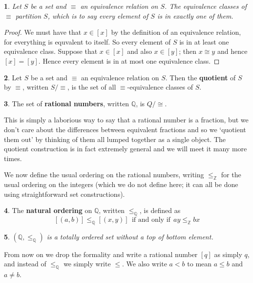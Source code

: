 \documentclass[oneside,english]{amsbook}
\numberwithin{section}{chapter}
\theoremstyle{plain}
\newtheorem{thm}{\protect\theoremname}
\theoremstyle{definition}
\newtheorem{defn}[thm]{\protect\definitionname}
\providecommand{\definitionname}{Definition}
\providecommand{\theoremname}{Theorem}
\begin{document}
\begin{thm}
	Let $S$ be a set and $\equiv$ an equivalence relation on $S$. The equivalence classes of $\equiv$ partition $S$, which is to say every element of $S$ is in exactly one of them.
\end{thm}

\begin{proof}
	We must have that $x\in [x]$ by the definition of an equivalence relation, for everything is equvalent to itself. So every element of $S$ is in at least one equivalence class. Suppose that $x\in [x]$ and also $x\in [y]$; then $x\cong y$ and hence $[x]=[y]$.  Hence every element is in at most one equivalence class. 
\end{proof}

\begin{defn}
	Let $S$ be a set and $\equiv$ an equivalence relation on $S$. Then the \textbf{quotient} of $S$ by $\equiv$, written $S/\equiv$, is the set of all $\equiv$-equivalence classes of $S$.
\end{defn}

\begin{defn}
	The set of \textbf{rational numbers}, written $\mathbb{Q}$,  is $Q/\cong$.
\end{defn}

This is simply a laborious way to say that a rational number is a fraction, but we don't care about the differences between equivalent fractions and so we `quotient them out' by thinking of them all lumped together as a single object. The quotient construction is in fact extremely general and we will meet it many more times.

We now define the usual ordering on the rational numbers, writing $\le_\mathbb{Z}$ for the usual ordering on the integers (which we do not define here; it can all be done using straightforward set constructions).

\begin{defn}
	The \textbf{natural ordering} on $\mathbb{Q}$,  written $\le_\mathbb{Q}$, is defined as
		\[
			[(a,b)]\le_\mathbb{Q}[(x,y)]\ \ \text{if and only if}\ \ ay\le_\mathbb{Z} bx
		\]
\end{defn}

\begin{thm}
	$(\mathbb{Q}, \le_\mathbb{Q})$ is a totally ordered set without a top of bottom element.
\end{thm}

From now on we drop the formality and write a rational number $[q]$ as simply $q$, and instead of $\le_\mathbb{Q}$ we simply write $\le$. We also write $a<b$ to mean $a\le b$ and $a\ne b$. 
\end{document}
